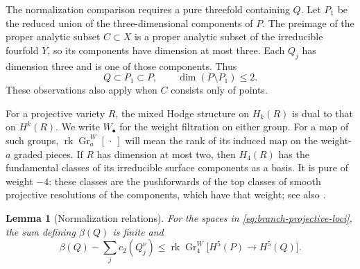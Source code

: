 \documentclass[11pt]{amsart}
\newtheorem{lemma}[theorem]{Lemma}
\theoremstyle{definition}
\theoremstyle{remark}
\numberwithin{equation}{section}
\DeclareMathOperator{\rk}{rk}
\DeclareMathOperator{\Gr}{Gr}
\begin{document}
The normalization comparison requires a pure threefold containing $Q$.
Let $P_1$ be the reduced union of the three-dimensional components of
$P$.  The preimage of the proper analytic subset $C\subset X$ is a
proper analytic subset of the irreducible fourfold $Y$, so its
components have dimension at most three.  Each $Q_j$ has dimension
three and is one of those components.  Thus
\[
 Q\subset P_1\subset P,\qquad \dim(P\setminus P_1)\leq2.
\]
These observations also apply when $C$ consists only of points.

For a projective variety $R$, the mixed Hodge structure on $H_k(R)$
is dual to that on $H^k(R)$.  We write $W_\bullet$ for the weight
filtration on either group.  For a map of such groups,
$\rk\Gr^W_a[\,\cdot\,]$ will mean the rank of its induced map on the
weight-$a$ graded pieces.  If $R$ has dimension at most two, then
$H_4(R)$ has the fundamental classes of its irreducible surface
components as a basis.  It is pure of weight $-4$: these classes are
the pushforwards of the top classes of smooth projective resolutions
of the components, which have that weight; see also
\cite[Theorem~8.2.4(ii)--(iii)]{DeligneHodgeIII}.

\begin{lemma}[Normalization relations]\label{lem:branch-normalization}
For the spaces in \eqref{eq:branch-projective-loci}, the sum defining
$\beta(Q)$ is finite and
\begin{equation}\label{eq:branch-normalization-bound}
 \beta(Q)-\sum_jc_2(Q_j^\nu)
 \leq \rk\Gr^W_4\bigl[H^5(P)\longrightarrow H^5(Q)\bigr].
\end{equation}
\end{lemma}
\end{document}
